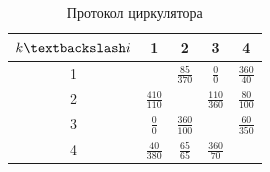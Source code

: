\begin{table}[h!]
    \centering
    \begin{tabular}{|c|c|c|c|c|}
    \hline
     $k \textbackslash i$ & 1 & 2 & 3 & 4 \\ \hline
    1 & \cellcolor{black!70}  & $\frac{85}{370}$ & $\frac{0}{0}$& $\frac{360}{40}$  \\ \hline
    2 & $\frac{410}{110}$  &\cellcolor{black!70}   & $\frac{110}{360}$  & $\frac{80}{100}$  \\ \hline
    3 & $\frac{0}{0}$  & $\frac{360}{100}$  & \cellcolor{black!70}  &  $\frac{60}{350}$ \\ \hline
    4 & $\frac{40}{380}$  & $\frac{65}{65}$  & $\frac{360}{70}$  & \cellcolor{black!70} \\ \hline
    \end{tabular}
    \caption{Протокол циркулятора}
    \label{tab:phaser}
    \end{table}


